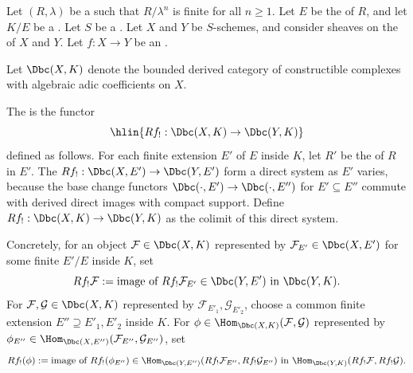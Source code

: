 \begin{definition} \label{definition:derived_direct_image_functor_with_compact_support_on_bounded_constructible_complexes_with_algebraic_coefficients_on_a_noetherian_scheme}
Let $(R, \lambda)$ be a   such that $R/\lambda^n$ is finite for all $n \geq 1$. Let $E$ be the  of $R$, and let $K/E$ be a . Let $S$ be a . Let $X$ and $Y$ be  $S$-schemes, and consider sheaves on the  of $X$ and $Y$. Let $f: X \to Y$ be an .

Let $\Dbc(X, K)$ denote the bounded derived category of constructible complexes with algebraic adic coefficients on $X$.

The  is the functor
$$\hlin{Rf_! : \Dbc(X, K) \to \Dbc(Y, K)}$$
defined as follows. For each finite extension $E'$ of $E$ inside $K$, let $R'$ be the  of $R$ in $E'$. The  $Rf_!: \Dbc(X, E') \to \Dbc(Y, E')$ form a direct system as $E'$ varies, because the base change functors $\Dbc(\cdot, E') \to \Dbc(\cdot, E'')$ for $E' \subseteq E''$ commute with derived direct images with compact support. Define $Rf_!: \Dbc(X, K) \to \Dbc(Y, K)$ as the colimit of this direct system.

Concretely, for an object $\mathcal{F} \in \Dbc(X, K)$ represented by $\mathcal{F}_{E'} \in \Dbc(X, E')$ for some finite $E'/E$ inside $K$, set
$$Rf_! \mathcal{F} := \text{image of } Rf_! \mathcal{F}_{E'} \in \Dbc(Y, E') \text{ in } \Dbc(Y, K).$$
For $\mathcal{F}, \mathcal{G} \in \Dbc(X, K)$ represented by $\mathcal{F}_{E'_1}, \mathcal{G}_{E'_2}$, choose a common finite extension $E'' \supseteq E'_1, E'_2$ inside $K$. For $\phi \in \Hom_{\Dbc(X, K)}(\mathcal{F}, \mathcal{G})$ represented by $\phi_{E''} \in \Hom_{\Dbc(X, E'')}(\mathcal{F}_{E''}, \mathcal{G}_{E''})$, set
$$Rf_! (\phi) := \text{image of } Rf_!(\phi_{E''}) \in \Hom_{\Dbc(Y, E'')}(Rf_! \mathcal{F}_{E''}, Rf_! \mathcal{G}_{E''}) \text{ in } \Hom_{\Dbc(Y, K)}(Rf_! \mathcal{F}, Rf_! \mathcal{G}).$$
\end{definition}
